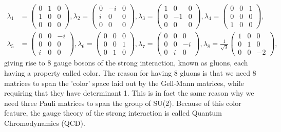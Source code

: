 \begin{align} \label{eq:gellmannmatrices}
	\lambda_1 &= \begin{pmatrix} 0 & 1 & 0 \\ 1 & 0 & 0 \\ 0 & 0 & 0 \end{pmatrix},
	\lambda_2 = \begin{pmatrix} 0 & -i & 0 \\ i & 0 & 0 \\ 0 & 0 & 0 \end{pmatrix},
	\lambda_3 = \begin{pmatrix} 1 & 0 & 0 \\ 0 & -1 & 0 \\ 0 & 0 & 0 \end{pmatrix},
	\lambda_4 = \begin{pmatrix} 0 & 0 & 1 \\ 0 & 0 & 0 \\ 1 & 0 & 0 \end{pmatrix}, \nonumber \\
	\lambda_5 &= \begin{pmatrix} 0 & 0 & -i \\ 0 & 0 & 0 \\ i & 0 & 0 \end{pmatrix},
	\lambda_6 = \begin{pmatrix} 0 & 0 & 0 \\ 0 & 0 & 1 \\ 0 & 1 & 0 \end{pmatrix},
	\lambda_7 = \begin{pmatrix} 0 & 0 & 0 \\ 0 & 0 & -i \\ 0 & i & 0 \end{pmatrix},
	\lambda_8 = \frac{1}{\sqrt{3}} \begin{pmatrix} 1 & 0 & 0 \\ 0 & 1 & 0 \\ 0 & 0 & -2 \end{pmatrix},
\end{align}
giving rise to 8 gauge bosons of the strong interaction, known as gluons, each having a property called color. The reason for having 8 gluons is that we need 8 matrices to span the 'color' space laid out by the Gell-Mann matrices, while requiring that they have determinant 1. This is in fact the same reason why we need three Pauli matrices to span the group of SU(2). Because of this color feature, the gauge theory of the strong interaction is called Quantum Chromodynamics (QCD).

